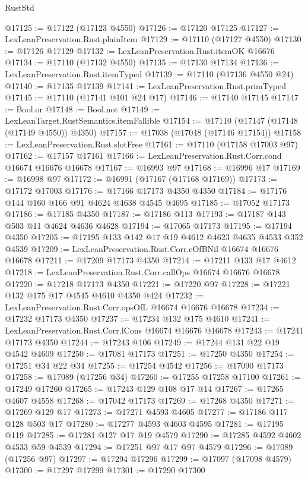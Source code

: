 \begin{lexlean}{RustStd}
\begin{coremodule}
@17125 := @17122 (@17123 @4550)
@17126 := @17120 @17125
@17127 := LexLeanPreservation.Rust.plainItem
@17129 := @17110 (@17127 @4550)
@17130 := @17126 @17129
@17132 := LexLeanPreservation.Rust.itemOK @16676
@17134 := @17110 (@17132 @4550)
@17135 := @17130 @17134
@17136 := LexLeanPreservation.Rust.itemTyped
@17139 := @17110 (@17136 @4550 @24)
@17140 := @17135 @17139
@17141 := LexLeanPreservation.Rust.primTyped
@17145 := @17110 (@17141 @101 @24 @17)
@17146 := @17140 @17145
@17147 := Bool.or
@17148 := Bool.not
@17149 := LexLeanTarget.RustSemantics.itemFallible
@17154 := @17110 (@17147 (@17148 (@17149 @4550)) @4350)
@17157 := @17038 (@17048 (@17146 @17154))
@17158 := LexLeanPreservation.Rust.slotFree
@17161 := @17110 (@17158 @17003 @97)
@17162 := @17157 @17161
@17166 := LexLeanPreservation.Rust.Corr.cond @16674 @16676 @16678
@17167 := @16993 @97
@17168 := @16996 @17
@17169 := @16998 @97
@17172 := @16991 (@17167 (@17168 @17169))
@17173 := @17172 @17003
@17176 := @17166 @17173 @4350 @4350
@17184 := @17176 @144 @160 @166 @91 @4624 @4638 @4545 @4695
@17185 := @17052 @17173
@17186 := @17185 @4350
@17187 := @17186 @113
@17193 := @17187 @143 @503 @11 @4624 @4636 @4628
@17194 := @17065 @17173
@17195 := @17194 @4350
@17205 := @17195 @133 @142 @17 @19 @4612 @4623 @4635 @4533 @352 @4539
@17209 := LexLeanPreservation.Rust.Corr.eOfBNil @16674 @16676 @16678
@17211 := @17209 @17173 @4350
@17214 := @17211 @133 @17 @4612
@17218 := LexLeanPreservation.Rust.Corr.callOps @16674 @16676 @16678
@17220 := @17218 @17173 @4350
@17221 := @17220 @97
@17228 := @17221 @132 @175 @17 @4545 @4610 @4350 @424
@17232 := LexLeanPreservation.Rust.Corr.opsOfL @16674 @16676 @16678
@17234 := @17232 @17173 @4350
@17237 := @17234 @132 @175 @4610
@17241 := LexLeanPreservation.Rust.Corr.lCons @16674 @16676 @16678
@17243 := @17241 @17173 @4350
@17244 := @17243 @106
@17249 := @17244 @131 @22 @19 @4542 @4609
@17250 := @17081 @17173
@17251 := @17250 @4350
@17254 := @17251 @34 @22 @34
@17255 := @17254 @4542
@17256 := @17090 @17173
@17258 := @17089 (@17256 @34)
@17260 := @17255 @17258 @17100
@17261 := @17249 @17260
@17265 := @17243 @129 @108 @17 @14
@17267 := @17265 @4607 @4558
@17268 := @17042 @17173
@17269 := @17268 @4350
@17271 := @17269 @129 @17
@17273 := @17271 @4593 @4605
@17277 := @17186 @117 @128 @503 @17
@17280 := @17277 @4593 @4603 @4595
@17281 := @17195 @119
@17285 := @17281 @127 @17 @19 @4579
@17290 := @17285 @4592 @4602 @4533 @59 @4539
@17294 := @17251 @97 @17 @97 @4579
@17296 := @17089 (@17256 @97)
@17297 := @17294 @17296
@17299 := @17097 (@17098 @4579)
@17300 := @17297 @17299
@17301 := @17290 @17300

\end{coremodule}
\end{lexlean}
